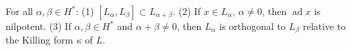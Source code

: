 For all $\alpha, \beta \in H^*$:
(1) $[L_\alpha, L_\beta] \subset L_{\alpha+\beta}$.
(2) If $x \in L_\alpha$, $\alpha \neq 0$, then $\operatorname{ad} x$ is nilpotent.
(3) If $\alpha, \beta \in H^*$ and $\alpha+\beta \neq 0$, then $L_\alpha$ is orthogonal to $L_\beta$ relative to the Killing form $\kappa$ of $L$.
